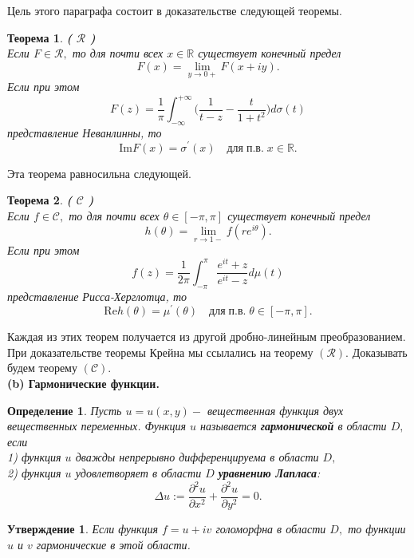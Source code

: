 \documentclass[12pt,a4paper]{article}
\theoremstyle{plain}   \newtheorem{Pro}{Задача}
\newtheorem{Sta}{Утверждение}
\newtheorem{Def}{Определение}
\newtheorem{The}{Теорема}
\begin{document}
Цель этого параграфа состоит в доказательстве следующей теоремы.
\begin{The}
{\bfseries ( $ \mathcal{R} $ ) }
\\
Если
$ F \in \mathcal{R} , $
то для почти всех
$ x \in \mathbb{R} $
существует конечный предел
$$
  F(x)=\lim _{y \rightarrow 0+} F(x+iy).
$$
Если при этом
$$
  F(z)= \frac{1}{\pi} \int _{-\infty}^{+\infty}
  \biggl ( \frac{1}{t-z}-\frac{t}{1+t^2} \biggr )
  d\sigma (t)
$$
представление Неванлинны, то
$$
  \mathrm{Im}F(x)=\sigma ^{\prime}(x)
  \quad для \; п.в. \; x \in \mathbb{R}.
$$
\end{The}
Эта теорема равносильна следующей.
\begin{The}
{\bfseries ( $ \mathcal{C} $ )}
\\
Если
$ f \in \mathcal{C} , $
то для почти всех
$ \theta \in [-\pi , \pi ] $
существует конечный предел
$$
  h(\theta )=\lim _{r \rightarrow 1-}
  f(re^{i\theta }).
$$
Если при этом
$$
  f(z)=\frac{1}{2\pi}\int _{-\pi}^{\pi}
  \frac{e^{it}+z}{e^{it}-z}d \mu (t)
$$
представление Рисса-Херглотца, то
$$
  \mathrm{Re}h(\theta )= \mu ^{\prime }(\theta )
  \quad для \; п.в. \; \theta \in [-\pi ,\pi ] .
$$
\end{The}
Каждая из этих теорем получается из другой дробно-линейным
преобразованием. При доказательстве теоремы Крейна мы
ссылались на теорему
$ ( \mathcal{R} ) . $
Доказывать будем теорему
$ ( \mathcal{C} ) . $
\\
{\bfseries (b) Гармонические функции.}
\begin{Def}
Пусть
$ u=u(x,y) - $
вещественная функция двух вещественных переменных. Функция
$ u $
называется
{\bfseries гармонической}
в области
$ D , $
если
\\
1) функция
$ u $
дважды непрерывно дифференцируема в области
$ D , $
\\
2) функция
$ u $
удовлетворяет в области
$ D $
{\bfseries уравнению Лапласа}:
$$
  \Delta u := \frac{\partial ^2 u}{\partial x^2}+
  \frac{\partial ^2 u}{\partial y^2} =0.
$$
\end{Def}
\begin{Sta}
Если функция
$ f=u+iv $
голоморфна в области
$ D , $
то функции
$ u $
и
$ v $
гармонические в этой области.
\end{Sta}
\end{document}
